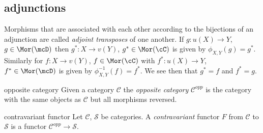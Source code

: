 \subsection{adjunctions}


\begin{frame}
Morphisms that are associated with each other according to the bijections of an adjunction are called {\it adjoint transposes} of one another. If $g:u(X) \rightarrow Y$, $g \in \Mor(\mcD)$ then $g^*: X \rightarrow v(Y)$, $g^* \in \Mor(\cC)$ is given by $\phi_{X,Y}(g) = g^*$. Similarly for $f: X \rightarrow v(Y)$, $f \in \Mor(\cC)$ with $f^*:u(X) \rightarrow Y$, $f^* \in \Mor(\mcD)$ is given by $\phi_{X,Y}^{-1}(f) = f^*$. We see then that $g^* = f$ and $f^* = g$.
\end{frame}

\begin{frame}
\begin{block}{opposite category}
Given a category $\mathcal{C}$ the {\it opposite category}
$\mathcal{C}^{opp}$ is the category with the same objects
as $\mathcal{C}$ but all morphisms reversed.
\end{block}

\begin{block}{contravariant functor}
Let $\mathcal{C}$, $\mathcal{S}$ be categories.
A {\it contravariant} functor $F$
from $\mathcal{C}$ to $\mathcal{S}$
is a functor $\mathcal{C}^{opp}\to \mathcal{S}$.
\end{block}
\end{frame}

